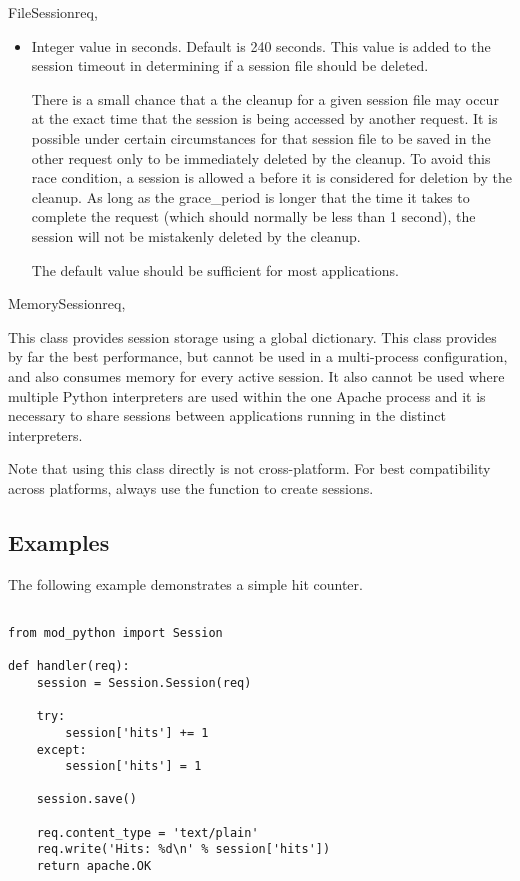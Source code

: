\begin{classdesc}{FileSession}{req, }
\begin{itemize}
  \item
    Integer value in seconds. Default is 240 seconds. This value is added
    to the session timeout in determining if a session file should be 
    deleted.
 
    There is a small chance that a the cleanup for a given session file
    may occur at the exact time that the session is being accessed by
    another request. It is possible under certain circumstances for that
    session file to be saved in the other request only to be immediately 
    deleted by the cleanup. To avoid this race condition, a session is
    allowed a  before it is considered for deletion by
    the cleanup.  As long as the grace_period is longer that the time it
    takes to complete the request (which should normally be less than 1
    second), the session will not be mistakenly deleted by the cleanup.

    The default value should be sufficient for most applications.
  \end{itemize}

\end{classdesc}

\begin{classdesc}{MemorySession}{req, }

  This class provides session storage using a global dictionary. This
  class provides by far the best performance, but cannot be used in a
  multi-process configuration, and also consumes memory for every
  active session. It also cannot be used where multiple Python interpreters
  are used within the one Apache process and it is necessary to share
  sessions between applications running in the distinct interpreters.

  Note that using this class directly is not cross-platform. For best
  compatibility across platforms, always use the 
  function to create sessions.

\end{classdesc}

\subsection{Examples\label{pyapi-sess-example}}
The following example demonstrates a simple hit counter.

    \begin{verbatim}

from mod_python import Session

def handler(req):
    session = Session.Session(req)

    try:
        session['hits'] += 1
    except:
        session['hits'] = 1

    session.save()

    req.content_type = 'text/plain'
    req.write('Hits: %d\n' % session['hits'])
    return apache.OK 
    \end{verbatim}

